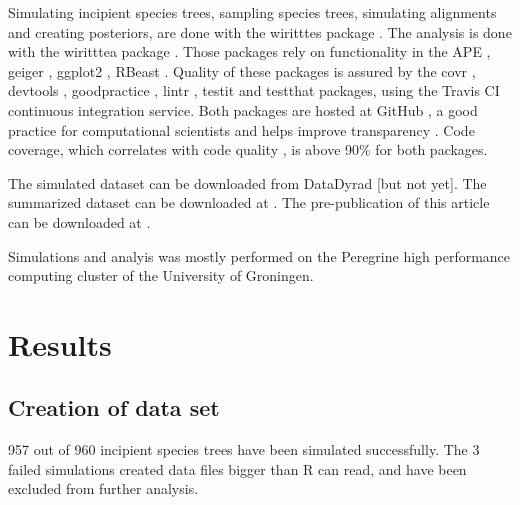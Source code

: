 \documentclass{article}
\begin{document}
Simulating incipient species trees, sampling species trees, simulating alignments
and creating posteriors, are done with the wiritttes package \cite{wiritttes}. The
analysis is done with the wiritttea package \cite{wiritttea}. Those packages rely on 
functionality in the APE \cite{APE}, geiger \cite{GEIGER}, ggplot2 \cite{ggplot2}, 
RBeast \cite{RBeast}. Quality of these packages is assured by 
the covr \cite{covr}, devtools \cite{devtools}, 
goodpractice \cite{goodpractice}, lintr \cite{lintr}, testit \cite{testit} 
and testthat \cite{testthat} packages, using the Travis CI \cite{travis} continuous integration service. 
Both packages are hosted at GitHub \cite{github}, a good practice for computational
scientists \cite{perez2016ten} and helps improve transparency \cite{gorgolewski2016practical}.
Code coverage, which correlates with code quality \cite{del1995correlation}, 
is above 90\% for both packages.

The simulated dataset can be downloaded from DataDyrad [but not yet]. The
summarized dataset can be downloaded at \cite{wirittte_data}. The
pre-publication of this article can be downloaded at \cite{wirittte_article}. 

Simulations and analyis was mostly performed on the Peregrine 
high performance computing cluster of the University of Groningen.

\section{Results}

\subsection{Creation of data set}





957 out of 960 incipient species trees have been simulated successfully. 
The 3 failed simulations created data files bigger than R can read, 
and have been excluded from further analysis. 
\end{document}
